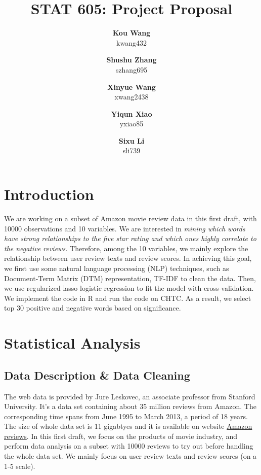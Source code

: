 \documentclass[12pt]{article}
\title{\textbf{STAT 605: Project Proposal}}
\author{\textbf{Kou Wang} \\ kwang432  \\ \and  \textbf{Shushu Zhang} \\ szhang695 \and \textbf{Xinyue Wang} \\ xwang2438 \and \textbf{Yiqun Xiao} \\ yxiao85 \and \textbf{Sixu Li} \\ sli739}
\date{}
\begin{document}
	\maketitle
	
\section{Introduction}
We are working on a subset of Amazon movie review data in this first draft, with 10000 observations and 10 variables. We are interested in \textit{mining which words have strong relationships to the five star rating and which ones highly correlate to the negative reviews.} Therefore, among the 10 variables, we mainly explore the relationship between user review texts and review scores. In achieving this goal, we first use some natural language processing (NLP) techniques, such as Document-Term Matrix (DTM) representation, TF-IDF to clean the data. Then, we use regularized lasso logistic regression to fit the model with cross-validation. We implement the code in R and run the code on CHTC. As a result, we select top 30 positive and negative words based on significance. 
 
\section{Statistical Analysis}
\label{sec:2}

\subsection{Data Description \& Data Cleaning}
\label{subsec:Cleaning}
The web data is provided by Jure Leskovec, an associate professor from Stanford University. It's a data set containing about 35 million reviews from Amazon. The corresponding time spans from June 1995 to March 2013, a period of 18 years. The size of whole data set is 11 gigabtyes and it is available on website \href{http://snap.stanford.edu/data/web-Amazon-links.html}{Amazon reviews}. In this first draft, we focus on the products of movie industry, and perform data analysis on a subset with 10000 reviews to try out before handling the whole data set. We mainly focus on user review texts and review scores (on a 1-5 scale).
\end{document}
